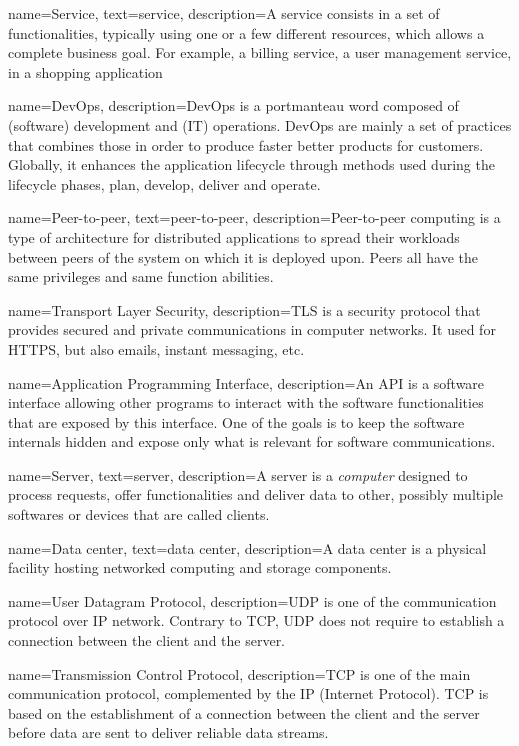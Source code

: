 
{
name={Service},
text={service},
description={A service consists in a set of functionalities, typically
using one or a few different resources, which allows a complete
business goal. For example, a billing service, a user management
service, in a shopping application}
}

{
name={DevOps},
description={DevOps is a
portmanteau word composed of (software) development and (IT)
operations. DevOps are mainly a set of practices that combines those
in order to produce faster better products for customers. Globally, it
enhances the application lifecycle through methods used during the
lifecycle phases, plan, develop, deliver and operate.}
}

 {
name={Peer-to-peer},
text={peer-to-peer},
description={Peer-to-peer
computing is a type of architecture for distributed applications to
spread their workloads between peers of the system on which it is
deployed upon. Peers all have the same privileges and same function
abilities.}
}

 {
name={Transport Layer Security},
description={TLS is a security protocol that provides secured and private
communications in computer networks. It used for HTTPS, but also emails,
instant messaging, etc.}
}


 {
name={Application Programming Interface},
description={An API is a software interface allowing other programs to
interact with the software functionalities that are exposed by this interface.
One of the goals is to keep the software internals hidden and expose only what
is relevant for software communications.}
}

 {
name={Server},
text={server},
description={A server is a \emph{computer} designed to process requests,
offer functionalities and deliver data to other, possibly multiple softwares or
devices that are called clients.}  }

 {
name={Data center},
text={data center},
description={A data center
is a physical facility hosting networked computing and storage
components.}
}

 {
name={User Datagram Protocol},
description={UDP is one of the communication protocol over IP network. Contrary to TCP, UDP does not require to establish a connection between the client and the server.}
}

 {
name={Transmission Control Protocol},
description={TCP is one of the main communication protocol,
complemented by the IP (Internet Protocol). TCP is based on the
establishment of a connection between the client and the server before
data are sent to deliver reliable data streams.}
}

